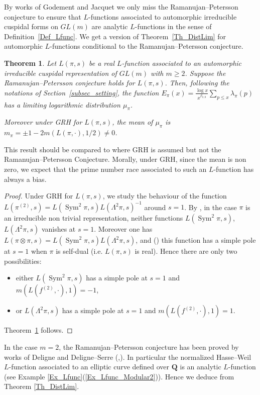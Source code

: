 \documentclass[a4paper,10pt]{amsart}
\theoremstyle{plain}
\newtheorem{theo}{Theorem}[section]
\theoremstyle{definition}
\begin{document}
By works of Godement and Jacquet \cite{GodementJacquet} we only miss the Ramanujan--Petersson conjecture to ensure that 
$L$-functions associated to automorphic irreducible cuspidal forms on $GL(m)$ 
are analytic $L$-functions in the sense of Definition~\ref{Def_Lfunc}.
We get a version of Theorem~\ref{Th_DistLim} for automorphic $L$-functions conditional to the Ramanujan--Petersson conjecture.
\begin{theo}\label{Th_Aut_bias}
Let $L(\pi,s)$ be a real $L$-function associated to an automorphic irreducible cuspidal representation of $GL(m)$ 
with $m\geq 2$.
Suppose the Ramanujan--Petersson conjecture holds for $L(\pi,s)$.
Then, following the notations of Section~\ref{subsec_setting}, the function
$E_{\pi}(x) = \frac{\log x}{x^{\beta_{\pi,0}}}\sum_{p\leq x} \lambda_{\pi}(p)$
has a limiting logarithmic distribution $\mu_{\pi}$.

Moreover under GRH for $L(\pi,s)$, the mean of $\mu_{\pi}$ is
$m_{\pi} = \pm 1 -2m(L(\pi,\cdot),1/2)\neq 0$.
\end{theo}

This result should be compared to \cite[Cor. 1.5]{ANS} where GRH is assumed but not the Ramanujan--Petersson Conjecture.
Morally, under GRH, since the mean is non zero, we expect that the prime number race associated to such an $L$-function has always a bias. 

\begin{proof}
Under GRH for $L(\pi,s)$, we study the behaviour of the function $L(\pi^{(2)},s) = L(\operatorname{Sym}^{2}\pi,s)L(\Lambda^{2}\pi,s)^{-1}$ around $s=1$.
By \cite[Th. 1.1]{Sha}, in the case $\pi$ is an irreducible non trivial representation,
neither functions  $L(\operatorname{Sym}^{2}\pi,s)$, $L(\Lambda^{2}\pi,s)$ vanishes at $s=1$.
Moreover one has $L(\pi\otimes\pi,s) = L(\operatorname{Sym}^{2}\pi,s)L(\Lambda^{2}\pi,s)$,
and (\cite[App.]{MW}) this function has a simple pole at $s=1$ when $\pi$ is self-dual (i.e. $L(\pi,s)$ is real).
Hence there are only two possibilities:
\begin{itemize}
\item either $L(\operatorname{Sym}^{2}\pi,s)$ has a simple pole at $s=1$ and $m(L(f^{(2)},\cdot),1) = -1$,
\item or $L(\Lambda^{2}\pi,s)$ has a simple pole at $s=1$ and $m(L(f^{(2)},\cdot),1) = 1$.
\end{itemize} 
Theorem~\ref{Th_Aut_bias} follows.
\end{proof}

In the case $m=2$, the Ramanujan--Petersson conjecture has been proved by works of Deligne and Deligne--Serre (\cite{Deligne_Weil1},\cite{DeligneSerre}).
In particular the normalized Hasse--Weil $L$-function associated to an elliptic curve defined over $\mathbf{Q}$ is an analytic $L$-function (see Example \ref{Ex_Lfunc}(\ref{Ex_Lfunc_Modular2})).
Hence we deduce \cite[Lem. 2.3, Lem. 2.6, Lem. 3.4]{FioEC} from Theorem \ref{Th_DistLim}.
\end{document}
